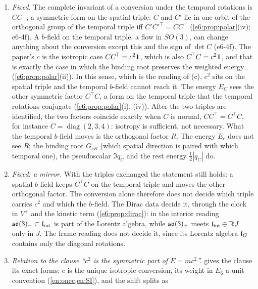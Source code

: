 \begin{remark}
\label{e6:rem:csym}
\begin{enumerate}[label=(\alph*),leftmargin=2.2em]
\item \emph{Fixed.} The complete invariant of a conversion under the temporal rotations is $CC^{\!\top}$, a symmetric form on the spatial triple:
$C$ and $C'$ lie in one orbit of the orthogonal group of the temporal triple iff $C'C'^{\!\top}=CC^{\!\top}$ (\cref{e6:prop:polar}(iv); e6-4f). A $b$-field on the temporal triple,
a flow in $SO(3)$, can change anything about the conversion except this and the sign of $\det C$ (e6-4f). The paper's $c$ is the isotropic case $CC^{\!\top}=c^2\mathbf 1$, which is also $C^{\!\top}C=c^2\mathbf 1$, and that
is exactly the case in which the binding root preserves the weighted energy (\cref{e6:prop:polar}(ii)). In this sense, which is the reading of (c),
$c^2$ sits on the spatial triple and the temporal $b$-field cannot reach it. The energy $E_C$ sees the other symmetric factor $C^{\!\top}C$, a form on
the temporal triple that the temporal rotations conjugate (\cref{e6:prop:polar}(i), (iv)). After the two triples are identified, the two factors coincide
exactly when $C$ is normal, $CC^{\!\top}=C^{\!\top}C$, for instance $C=\operatorname{diag}(2,3,4)$: isotropy is sufficient, not necessary. What the temporal $b$-field moves is the orthogonal factor $R$. The energy $E_c$ does not see
$R$; the binding root $G_{cR}$ (which spatial direction is paired with which temporal one), the pseudoscalar $\Im q_C$ and the rest energy
$\tfrac12|q_C|$ do.
\item \emph{Fixed: a mirror.} With the triples exchanged the statement still holds: a spatial $b$-field keeps $C^{\!\top}C$ on the temporal triple and
moves the other orthogonal factor. The conversion alone therefore does not decide which triple carries $c^2$ and which the $b$-field. The Dirac data
decide it, through the clock in $V^+$ and the kinetic term (\cref{e6:prop:dirac}): in the interior reading $\mathfrak{so}(3)_-\subset\mathfrak l_{\rm int}$ is part of the
Lorentz algebra, while $\mathfrak{so}(3)_+$ meets $\mathfrak l_{\rm int}\oplus\mathbb{R} J$ only in $J$. The frame reading does not decide it, since its Lorentz algebra $\mathfrak l_G$ contains
only the diagonal rotations.
\item \emph{Relation to the clause ``$c^2$ is the symmetric part of $E=mc^2$''.}  gives the clause its exact forms: $c$ is
the unique isotropic conversion, its weight in $E_6$ a unit convention (\cref{en:onec,en:SI}), and the shift splits as

\end{enumerate}
\end{remark}
